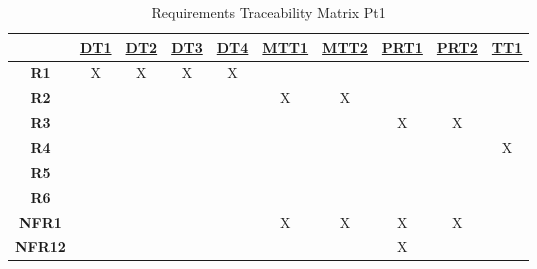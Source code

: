 \documentclass[12pt, titlepage]{article}
\begin{document}
\noindent
\begin{table}[H]
  \centering
  \begin{tabular}{|c|c|c|c|c|c|c|c|c|c|}
    \hline
                   & \hyperref[DT1]{DT1} & \hyperref[DT2]{DT2} & \hyperref[DT3]{DT3} & \hyperref[DT4]{DT4} & \hyperref[MTT1]{MTT1} & \hyperref[MTT2]{MTT2} & \hyperref[PRT1]{PRT1} & \hyperref[PRT2]{PRT2} & \hyperref[TT1]{TT1} \\
    \hline
    \textbf{R1}    & X                   & X                   & X                   & X                   &                       &                       &                       &                       &                     \\ \hline
    \textbf{R2}    &                     &                     &                     &                     & X                     & X                     &                       &                       &                     \\ \hline
    \textbf{R3}    &                     &                     &                     &                     &                       &                       & X                     & X                     &                     \\ \hline
    \textbf{R4}    &                     &                     &                     &                     &                       &                       &                       &                       & X                   \\ \hline
    \textbf{R5}    &                     &                     &                     &                     &                       &                       &                       &                       &                     \\ \hline
    \textbf{R6}    &                     &                     &                     &                     &                       &                       &                       &                       &                     \\ \hline
    \textbf{NFR1}  &                     &                     &                     &                     & X                     & X                     & X                     & X                     &                     \\ \hline
    \textbf{NFR12} &                     &                     &                     &                     &                       &                       & X                     &                       &                     \\ \hline
  \end{tabular}
  \caption{ Requirements Traceability Matrix Pt1}
  \label{Table:A_Req_trace}
\end{table}
\end{document}
